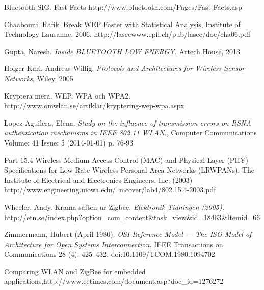 \documentclass[a4paper,12pt,fleqn]{article}
\begin{document}
Bluetooth SIG. Fast Facts http://www.bluetooth.com/Pages/Fast-Facts.asp 

Chaabouni, Rafik. Break WEP Faster with Statistical Analysis, Institute of Technology Lausanne, 2006. http://lasecwww.epfl.ch/pub/lasec/doc/cha06.pdf

Gupta, Naresh. \emph{Inside BLUETOOTH LOW ENERGY.} Artech House, 2013

Holger Karl, Andreas Willig. \emph{Protocols and Architectures for Wireless Sensor Networks}, Wiley, 2005

Kryptera mera. WEP, WPA och WPA2. http://www.omwlan.se/artiklar/kryptering-wep-wpa.aspx 

Lopez-Aguilera, Elena. \emph{Study on the influence of transmission errors on RSNA authentication mechanisms in IEEE 802.11 WLAN.}, Computer Communications Volume: 41 Issue: 5 (2014-01-01) p. 76-93

Part 15.4 Wireless Medium Access Control (MAC) and Physical Layer (PHY) Specifications for Low-Rate Wireless Personal Area Networks (LR\text{-}WPANs). The Institute of Electrical and Electronics Engineers, Inc. (2003) \\ http://www.engineering.uiowa.edu/~mcover/lab4/802.15.4-2003.pdf

Wheeler, Andy. Krama saften ur Zigbee. \emph{Elektronik Tidningen (2005).} \\ http://etn.se/index.php?option=com\_content\&task=view\&id=18463\&Itemid=66

Zimmermann, Hubert (April 1980).\emph{ OSI Reference Model — The ISO Model of Architecture for Open Systems Interconnection.} IEEE Transactions on Communications 28 (4): 425–432. doi:10.1109/TCOM.1980.1094702

Comparing WLAN and ZigBee for embedded applications,http://www.eetimes.com/document.asp?doc\_id=1276272
\end{document}
